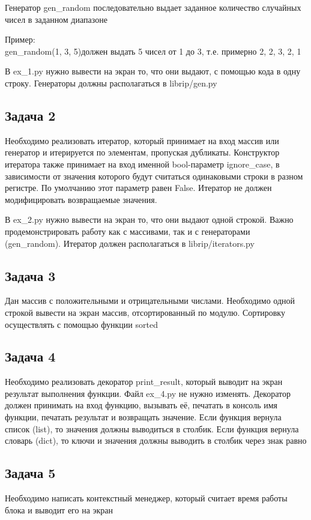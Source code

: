 \documentclass{article}
\begin{document}
Генератор gen\_random последовательно выдает заданное количество случайных чисел в заданном диапазоне

Пример: \\
gen\_random(1, 3, 5)должен выдать 5 чисел от 1 до 3, т.е. примерно 2, 2, 3, 2, 1

В ex\_1.py нужно вывести на экран то, что они выдают, с помощью кода в одну строку. Генераторы должны располагаться в librip/gen.py

\subsection{Задача 2}
Необходимо реализовать итератор, который принимает на вход массив или генератор и итерируется по элементам, пропуская дубликаты. Конструктор итератора также принимает на вход именной bool-параметр ignore\_case, в зависимости от значения которого будут считаться одинаковыми строки в разном регистре. По умолчанию этот параметр равен False. Итератор не должен модифицировать возвращаемые значения.

В ex\_2.py нужно вывести на экран то, что они выдают одной строкой. Важно продемонстрировать работу как с массивами, так и с генераторами (gen\_random).
Итератор должен располагаться в librip/iterators.py

\subsection{Задача 3}
Дан массив с положительными и отрицательными числами. Необходимо одной строкой вывести на экран массив, отсортированный по модулю. Сортировку осуществлять с помощью функции sorted

\subsection{Задача 4}
Необходимо реализовать декоратор print\_result, который выводит на экран результат выполнения функции. Файл ex\_4.py не нужно изменять.
Декоратор должен принимать на вход функцию, вызывать её, печатать в консоль имя функции, печатать результат и возвращать значение. 
Если функция вернула список (list), то значения должны выводиться в столбик.
Если функция вернула словарь (dict), то ключи и значения должны выводить в столбик через знак равно

\subsection{Задача 5}
Необходимо написать контекстный менеджер, который считает время работы блока и выводит его на экран
\end{document}
